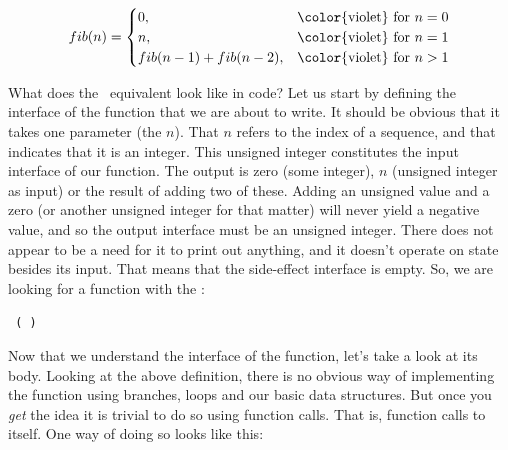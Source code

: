 \begin{eqnarray}
  \nonumber
  fib(n) =
    \begin{cases}
      0, & \text{\color{violet} for $n=0$} \\
      n, & \text{\color{violet} for $n=1$} \\
      fib(n-1)+fib(n-2), & \text{\color{violet} for $n>1$} \\
    \end{cases}
\end{eqnarray}

What does the \csharp\ equivalent look like in code? Let us start by defining the interface of the function that we are about to write. It should be obvious that it takes one parameter (the $n$). That $n$ refers to the index of a sequence, and that indicates that it is an  integer. This unsigned integer constitutes the input interface of our function. The output is zero (some integer), $n$ (unsigned integer as input) or the result of adding two of these. Adding an unsigned value and a zero (or another unsigned integer for that matter) will never yield a negative value, and so the output interface must be an unsigned integer. There does not appear to be a need for it to print out anything, and it doesn't operate on state besides its input. That means that the side-effect interface is empty. So, we are looking for a function with the :
\begin{center}
  \texttt{  ( )}
\end{center}

Now that we understand the interface of the function, let's take a look at its body. Looking at the above definition, there is no obvious way of implementing the  function using branches, loops and our basic data structures. But once you \textsl{get} the idea it is trivial to do so using function calls. That is, function calls to itself. One way of doing so looks like this:

